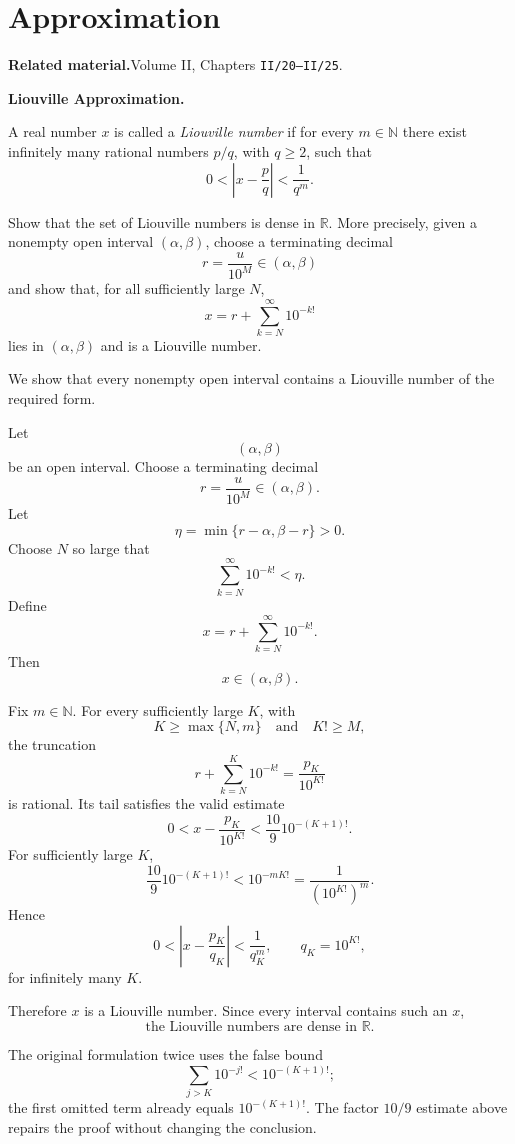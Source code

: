 \section{Approximation}

\par\medskip\noindent\textbf{Related material.}\quad  Volume II, Chapters \texttt{II/20--II/25}.

\begin{problem}[CP-II-0005]
\label{prob:cp-ii-0005}
\textbf{Liouville Approximation.}

\hspace*{1.5em}A real number \(x\) is called a \emph{Liouville number} if for every
\(m\in\mathbb N\) there exist infinitely many rational numbers \(p/q\),
with \(q\ge2\), such that
\[
0<\left|x-\frac pq\right|<\frac1{q^m}.
\]

Show that the set of Liouville numbers is dense in \(\mathbb R\).
More precisely, given a nonempty open interval \((\alpha,\beta)\),
choose a terminating decimal
\[
r=\frac{u}{10^M}\in(\alpha,\beta)
\]
and show that, for all sufficiently large \(N\),
\[
x=r+\sum_{k=N}^{\infty}10^{-k!}
\]
lies in \((\alpha,\beta)\) and is a Liouville number.
\end{problem}

\begin{solution}
We show that every nonempty open interval contains a Liouville number of the required form.

Let
\[
(\alpha,\beta)
\]
be an open interval. Choose a terminating decimal
\[
r=\frac{u}{10^M}
\in(\alpha,\beta).
\]
Let
\[
\eta
=
\min\{r-\alpha,\beta-r\}>0.
\]
Choose \(N\) so large that
\[
\sum_{k=N}^{\infty}10^{-k!}<\eta.
\]
Define
\[
x
=
r+
\sum_{k=N}^{\infty}10^{-k!}.
\]
Then
\[
x\in(\alpha,\beta).
\]

Fix \(m\in\mathbb N\). For every sufficiently large \(K\), with
\[
K\ge\max\{N,m\}
\quad\text{and}\quad
K!\ge M,
\]
the truncation
\[
r+
\sum_{k=N}^{K}10^{-k!}
=
\frac{p_K}{10^{K!}}
\]
is rational. Its tail satisfies the valid estimate
\[
0<
x-\frac{p_K}{10^{K!}}
<
\frac{10}{9}10^{-(K+1)!}.
\]
For sufficiently large \(K\),
\[
\frac{10}{9}10^{-(K+1)!}
<
10^{-mK!}
=
\frac1{(10^{K!})^m}.
\]
Hence
\[
\boxed{
0<
\left|
x-\frac{p_K}{q_K}
\right|
<
\frac1{q_K^m},
\qquad
q_K=10^{K!},
}
\]
for infinitely many \(K\).

Therefore \(x\) is a Liouville number. Since every interval contains such an \(x\),
\[
\boxed{
\text{the Liouville numbers are dense in }\mathbb R.
}
\]

The original formulation twice uses the false bound
\[
\sum_{j>K}10^{-j!}<10^{-(K+1)!};
\]
the first omitted term already equals \(10^{-(K+1)!}\). The factor \(10/9\) estimate above
repairs the proof without changing the conclusion.
\end{solution}


